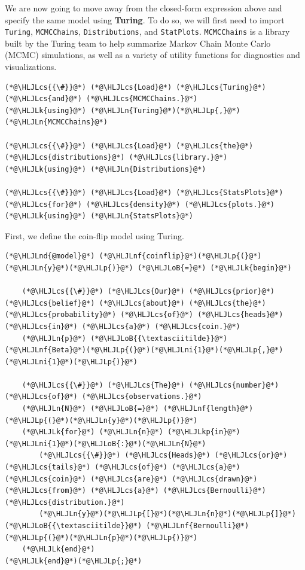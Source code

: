 \documentclass[12pt,a4paper]{article}
\newcommand{\HLJLk}[1]{\textcolor[RGB]{148,91,176}{\textbf{#1}}}
\newcommand{\HLJLkp}[1]{\textcolor[RGB]{148,91,176}{\textbf{#1}}}
\newcommand{\HLJLn}[1]{#1}
\newcommand{\HLJLnd}[1]{\textcolor[RGB]{214,102,97}{#1}}
\newcommand{\HLJLnf}[1]{\textcolor[RGB]{66,102,213}{#1}}
\newcommand{\HLJLni}[1]{\textcolor[RGB]{59,151,46}{#1}}
\newcommand{\HLJLoB}[1]{\textcolor[RGB]{102,102,102}{\textbf{#1}}}
\newcommand{\HLJLp}[1]{#1}
\newcommand{\HLJLcs}[1]{\textcolor[RGB]{153,153,119}{\textit{#1}}}
\begin{document}
We are now going to move away from the closed-form expression above and specify the same model using \textbf{Turing}. To do so, we will first need to import \texttt{Turing}, \texttt{MCMCChains}, \texttt{Distributions}, and \texttt{StatPlots}. \texttt{MCMCChains} is a library built by the Turing team to help summarize Markov Chain Monte Carlo (MCMC) simulations, as well as a variety of utility functions for diagnostics and visualizations.


\begin{lstlisting}
(*@\HLJLcs{{\#}}@*) (*@\HLJLcs{Load}@*) (*@\HLJLcs{Turing}@*) (*@\HLJLcs{and}@*) (*@\HLJLcs{MCMCChains.}@*)
(*@\HLJLk{using}@*) (*@\HLJLn{Turing}@*)(*@\HLJLp{,}@*) (*@\HLJLn{MCMCChains}@*)

(*@\HLJLcs{{\#}}@*) (*@\HLJLcs{Load}@*) (*@\HLJLcs{the}@*) (*@\HLJLcs{distributions}@*) (*@\HLJLcs{library.}@*)
(*@\HLJLk{using}@*) (*@\HLJLn{Distributions}@*)

(*@\HLJLcs{{\#}}@*) (*@\HLJLcs{Load}@*) (*@\HLJLcs{StatsPlots}@*) (*@\HLJLcs{for}@*) (*@\HLJLcs{density}@*) (*@\HLJLcs{plots.}@*)
(*@\HLJLk{using}@*) (*@\HLJLn{StatsPlots}@*)
\end{lstlisting}


First, we define the coin-flip model using Turing.


\begin{lstlisting}
(*@\HLJLnd{@model}@*) (*@\HLJLnf{coinflip}@*)(*@\HLJLp{(}@*)(*@\HLJLn{y}@*)(*@\HLJLp{)}@*) (*@\HLJLoB{=}@*) (*@\HLJLk{begin}@*)
    
    (*@\HLJLcs{{\#}}@*) (*@\HLJLcs{Our}@*) (*@\HLJLcs{prior}@*) (*@\HLJLcs{belief}@*) (*@\HLJLcs{about}@*) (*@\HLJLcs{the}@*) (*@\HLJLcs{probability}@*) (*@\HLJLcs{of}@*) (*@\HLJLcs{heads}@*) (*@\HLJLcs{in}@*) (*@\HLJLcs{a}@*) (*@\HLJLcs{coin.}@*)
    (*@\HLJLn{p}@*) (*@\HLJLoB{{\textasciitilde}}@*) (*@\HLJLnf{Beta}@*)(*@\HLJLp{(}@*)(*@\HLJLni{1}@*)(*@\HLJLp{,}@*) (*@\HLJLni{1}@*)(*@\HLJLp{)}@*)
    
    (*@\HLJLcs{{\#}}@*) (*@\HLJLcs{The}@*) (*@\HLJLcs{number}@*) (*@\HLJLcs{of}@*) (*@\HLJLcs{observations.}@*)
    (*@\HLJLn{N}@*) (*@\HLJLoB{=}@*) (*@\HLJLnf{length}@*)(*@\HLJLp{(}@*)(*@\HLJLn{y}@*)(*@\HLJLp{)}@*)
    (*@\HLJLk{for}@*) (*@\HLJLn{n}@*) (*@\HLJLkp{in}@*) (*@\HLJLni{1}@*)(*@\HLJLoB{:}@*)(*@\HLJLn{N}@*)
        (*@\HLJLcs{{\#}}@*) (*@\HLJLcs{Heads}@*) (*@\HLJLcs{or}@*) (*@\HLJLcs{tails}@*) (*@\HLJLcs{of}@*) (*@\HLJLcs{a}@*) (*@\HLJLcs{coin}@*) (*@\HLJLcs{are}@*) (*@\HLJLcs{drawn}@*) (*@\HLJLcs{from}@*) (*@\HLJLcs{a}@*) (*@\HLJLcs{Bernoulli}@*) (*@\HLJLcs{distribution.}@*)
        (*@\HLJLn{y}@*)(*@\HLJLp{[}@*)(*@\HLJLn{n}@*)(*@\HLJLp{]}@*) (*@\HLJLoB{{\textasciitilde}}@*) (*@\HLJLnf{Bernoulli}@*)(*@\HLJLp{(}@*)(*@\HLJLn{p}@*)(*@\HLJLp{)}@*)
    (*@\HLJLk{end}@*)
(*@\HLJLk{end}@*)(*@\HLJLp{;}@*)
\end{lstlisting}
\end{document}
